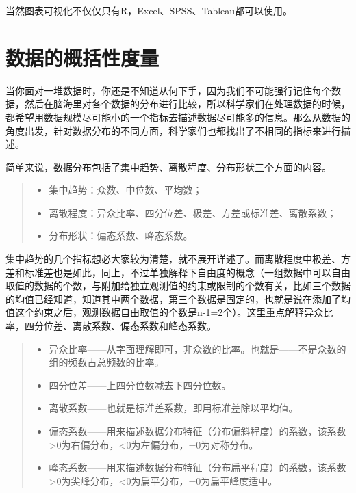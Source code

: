\documentclass[]{ctexbook}
\providecommand{\tightlist}{%
  \setlength{\itemsep}{0pt}\setlength{\parskip}{0pt}}
\begin{document}
当然图表可视化不仅仅只有R，Excel、SPSS、Tableau都可以使用。

\hypertarget{ux6570ux636eux7684ux6982ux62ecux6027ux5ea6ux91cf}{%
\section{数据的概括性度量}\label{ux6570ux636eux7684ux6982ux62ecux6027ux5ea6ux91cf}}

当你面对一堆数据时，你还是不知道从何下手，因为我们不可能强行记住每个数据，然后在脑海里对各个数据的分布进行比较，所以科学家们在处理数据的时候，都希望用数据规模尽可能小的一个指标去描述数据尽可能多的信息。那么从数据的角度出发，针对数据分布的不同方面，科学家们也都找出了不相同的指标来进行描述。

简单来说，数据分布包括了集中趋势、离散程度、分布形状三个方面的内容。

\begin{quote}
\begin{itemize}
\tightlist
\item
  集中趋势：众数、中位数、平均数；
\item
  离散程度：异众比率、四分位差、极差、方差或标准差、离散系数；
\item
  分布形状：偏态系数、峰态系数。
\end{itemize}
\end{quote}

集中趋势的几个指标想必大家较为清楚，就不展开详述了。而离散程度中极差、方差和标准差也是如此，同上，不过单独解释下自由度的概念（一组数据中可以自由取值的数据的个数，与附加给独立观测值的约束或限制的个数有关，比如三个数据的均值已经知道，知道其中两个数据，第三个数据是固定的，也就是说在添加了均值这个约束之后，观测数据自由取值的个数是n-1=2个）。这里重点解释异众比率，四分位差、离散系数、偏态系数和峰态系数。

\begin{quote}
\begin{itemize}
\tightlist
\item
  异众比率------从字面理解即可，非众数的比率。也就是------不是众数的组的频数占总频数的比率。
\item
  四分位差------上四分位数减去下四分位数。
\item
  离散系数------也就是标准差系数，即用标准差除以平均值。
\item
  偏态系数------用来描述数据分布特征（分布偏斜程度）的系数，该系数\textgreater0为右偏分布，\textless0为左偏分布，=0为对称分布。
\item
  峰态系数------用来描述数据分布特征（分布扁平程度）的系数，该系数\textgreater0为尖峰分布，\textless0为扁平分布，=0为扁平峰度适中。
\end{itemize}
\end{quote}
\end{document}
